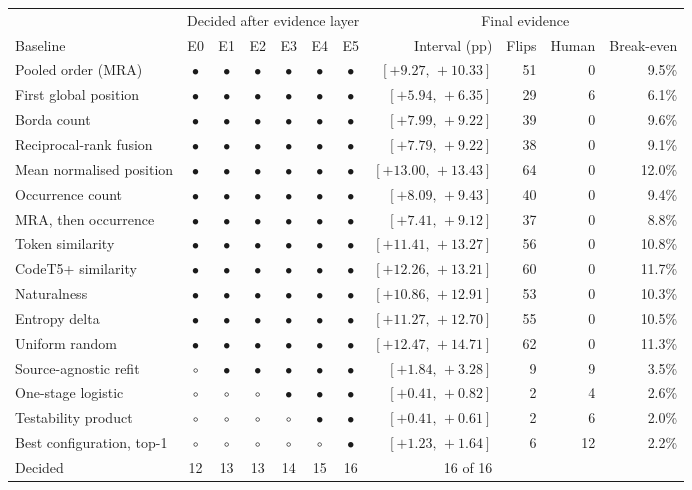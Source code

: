\begin{tabular}{@{}lccccccrrrr@{}}
\toprule
 & \multicolumn{6}{c}{Decided after evidence layer} & \multicolumn{4}{c}{Final evidence} \\
\cmidrule(lr){2-7}\cmidrule(l){8-11}
Baseline & E0 & E1 & E2 & E3 & E4 & E5 & Interval (pp) & Flips & Human & Break-even \\
\midrule
Pooled order (MRA) & $\bullet$ & $\bullet$ & $\bullet$ & $\bullet$ & $\bullet$ & $\bullet$ & $[+9.27,\,+10.33]$ & 51 & 0 & 9.5\% \\
First global position & $\bullet$ & $\bullet$ & $\bullet$ & $\bullet$ & $\bullet$ & $\bullet$ & $[+5.94,\,+6.35]$ & 29 & 6 & 6.1\% \\
Borda count & $\bullet$ & $\bullet$ & $\bullet$ & $\bullet$ & $\bullet$ & $\bullet$ & $[+7.99,\,+9.22]$ & 39 & 0 & 9.6\% \\
Reciprocal-rank fusion & $\bullet$ & $\bullet$ & $\bullet$ & $\bullet$ & $\bullet$ & $\bullet$ & $[+7.79,\,+9.22]$ & 38 & 0 & 9.1\% \\
Mean normalised position & $\bullet$ & $\bullet$ & $\bullet$ & $\bullet$ & $\bullet$ & $\bullet$ & $[+13.00,\,+13.43]$ & 64 & 0 & 12.0\% \\
Occurrence count & $\bullet$ & $\bullet$ & $\bullet$ & $\bullet$ & $\bullet$ & $\bullet$ & $[+8.09,\,+9.43]$ & 40 & 0 & 9.4\% \\
MRA, then occurrence & $\bullet$ & $\bullet$ & $\bullet$ & $\bullet$ & $\bullet$ & $\bullet$ & $[+7.41,\,+9.12]$ & 37 & 0 & 8.8\% \\
Token similarity & $\bullet$ & $\bullet$ & $\bullet$ & $\bullet$ & $\bullet$ & $\bullet$ & $[+11.41,\,+13.27]$ & 56 & 0 & 10.8\% \\
CodeT5+ similarity & $\bullet$ & $\bullet$ & $\bullet$ & $\bullet$ & $\bullet$ & $\bullet$ & $[+12.26,\,+13.21]$ & 60 & 0 & 11.7\% \\
Naturalness & $\bullet$ & $\bullet$ & $\bullet$ & $\bullet$ & $\bullet$ & $\bullet$ & $[+10.86,\,+12.91]$ & 53 & 0 & 10.3\% \\
Entropy delta & $\bullet$ & $\bullet$ & $\bullet$ & $\bullet$ & $\bullet$ & $\bullet$ & $[+11.27,\,+12.70]$ & 55 & 0 & 10.5\% \\
Uniform random & $\bullet$ & $\bullet$ & $\bullet$ & $\bullet$ & $\bullet$ & $\bullet$ & $[+12.47,\,+14.71]$ & 62 & 0 & 11.3\% \\
\midrule
Source-agnostic refit & $\circ$ & $\bullet$ & $\bullet$ & $\bullet$ & $\bullet$ & $\bullet$ & $[+1.84,\,+3.28]$ & 9 & 9 & 3.5\% \\
One-stage logistic & $\circ$ & $\circ$ & $\circ$ & $\bullet$ & $\bullet$ & $\bullet$ & $[+0.41,\,+0.82]$ & 2 & 4 & 2.6\% \\
Testability product & $\circ$ & $\circ$ & $\circ$ & $\circ$ & $\bullet$ & $\bullet$ & $[+0.41,\,+0.61]$ & 2 & 6 & 2.0\% \\
Best configuration, top-1 & $\circ$ & $\circ$ & $\circ$ & $\circ$ & $\circ$ & $\bullet$ & $[+1.23,\,+1.64]$ & 6 & 12 & 2.2\% \\
\midrule
Decided & 12 & 13 & 13 & 14 & 15 & 16 & 16 of 16 & & & \\
\bottomrule
\end{tabular}
